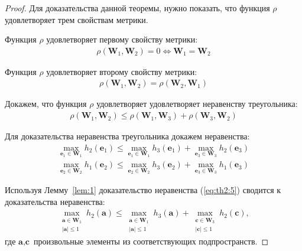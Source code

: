 \documentclass[12pt, twoside]{article}
\numberwithin{equation}{section}
\begin{document}
\begin{proof}
Для доказательства данной теоремы, нужно показать, что функция $\rho$ удовлетворяет трем свойствам метрики.

Функция $\rho$ удовлетворяет первому свойству метрики:
\begin{equation}
\label{eq:th2:2}
\begin{aligned}
\rho\left(\textbf{W}_1, \textbf{W}_2\right) = 0 \Leftrightarrow \textbf{W}_1 = \textbf{W}_2
\end{aligned}
\end{equation}

Функция $\rho$ удовлетворяет второму свойству метрики:
\begin{equation}
\label{eq:th2:3}
\begin{aligned}
\rho\left(\textbf{W}_1, \textbf{W}_2\right) = \rho\left(\textbf{W}_2, \textbf{W}_1\right)
\end{aligned}
\end{equation}

Докажем, что функция $\rho$ удовлетворяет удовлетворяет неравенству треугольника:
\begin{equation}
\label{eq:th2:4}
\begin{aligned}
\rho\left(\textbf{W}_1, \textbf{W}_2\right) \leq \rho\left(\textbf{W}_1, \textbf{W}_3\right) + \rho\left(\textbf{W}_3, \textbf{W}_2\right)
\end{aligned}
\end{equation}

Для доказательства неравенства треугольника докажем неравенства:
\begin{equation}
\label{eq:th2:5}
\begin{aligned}
\max_{\textbf{e}_1 \in \textbf{W}_1}h_{2}\left(\textbf{e}_1\right) \leq 
\max_{\textbf{e}_1\in \textbf{W}_1}h_{3}\left(\textbf{e}_1\right)+
\max_{\textbf{e}_3 \in \textbf{W}_3}h_{2}\left(\textbf{e}_3\right) \\
\max_{\textbf{e}_2 \in \textbf{W}_2}h_{1}\left(\textbf{e}_2\right) \leq 
\max_{\textbf{e}_2\in \textbf{W}_2}h_{3}\left(\textbf{e}_2\right)+
\max_{\textbf{e}_3 \in \textbf{W}_3}h_{1}\left(\textbf{e}_3\right)
\end{aligned}
\end{equation}

Используя Лемму~\ref{lem:1} доказательство неравенства (\ref{eq:th2:5}) сводится к доказательства неравенства:
\begin{equation}
\label{eq:th2:6}
\begin{aligned}
\max_{\substack{\textbf{a} \in \textbf{W}_1 \\ \left|\textbf{a}\right| \leq 1}}h_{2}\left(\textbf{a}\right) \leq 
\max_{\substack{\textbf{a} \in \textbf{W}_1 \\ \left|\textbf{a}\right| \leq 1}}h_{3}\left(\textbf{a}\right)+
\max_{\substack{\textbf{c} \in \textbf{W}_3 \\ \left|\textbf{c}\right| \leq 1}}h_{2}\left(\textbf{c}\right),
\end{aligned}
\end{equation}
где $\textbf{a}, \textbf{c}$ произвольные элементы из соответствующих подпространств. 


\end{proof}
\end{document}

